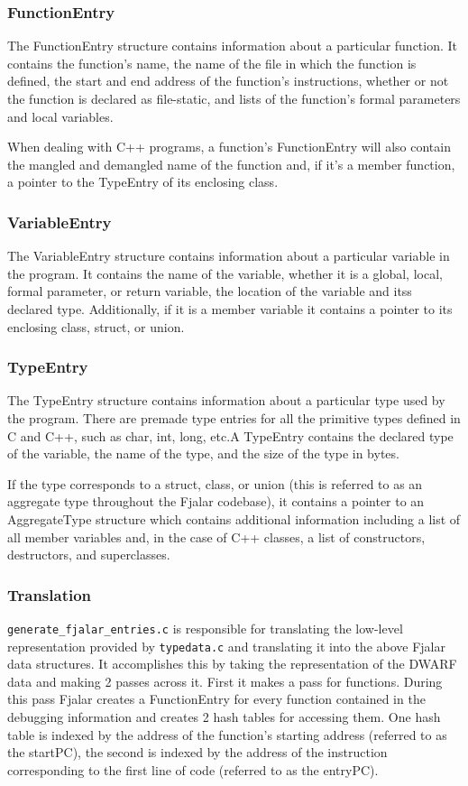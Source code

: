 \documentclass[11pt]{article}
\begin{document}
\subsubsection{FunctionEntry}
The FunctionEntry structure contains information about a particular
function. It contains the function's name, the name of the file in which  
the function is defined, the start and end address of the function's 
instructions, whether or not the function is declared as file-static,
and lists of the function's formal parameters and local variables. 

When dealing with C++ programs, a function's FunctionEntry will also  
contain the mangled and demangled name of the function and, if it's a
member function, a pointer to the TypeEntry of its enclosing class.

\subsubsection{VariableEntry}
The VariableEntry structure contains information about a particular
variable in the program. It contains the name of the variable, whether
it is a global, local, formal parameter, or return variable, the
location of the variable and itss declared type. Additionally,
if it is a member variable it contains a pointer to its enclosing
class, struct, or union.

\subsubsection{TypeEntry}
The TypeEntry structure contains information about a particular type used
by the program. There are premade type entries for all the primitive
types defined in C and C++, such as char, int, long, etc.A TypeEntry
contains  the
declared type of the variable, the name of the type, and the size of
the type in bytes.

If the type corresponds to a struct, class, or union (this is referred to
as an aggregate type throughout the Fjalar codebase), it contains a pointer
to an AggregateType structure which contains additional information
including a list of all member variables and, in the case of C++
classes, a list of constructors, destructors, and superclasses.

\subsubsection{Translation}
\texttt{generate\_fjalar\_entries.c} is responsible for translating the low-level
representation provided by \texttt{typedata.c} and translating it into the above
Fjalar data structures. It accomplishes this by taking the representation of
the DWARF data and making 2 passes across it. First it makes a pass
for functions. During this pass Fjalar creates a FunctionEntry for every function contained
in the debugging information and creates 2 hash tables for accessing
them. One hash table is indexed by the address of the function's starting
address (referred to as the startPC), the second is indexed by the
address of the instruction corresponding to the first line of code
(referred to as the entryPC). 
\end{document}
